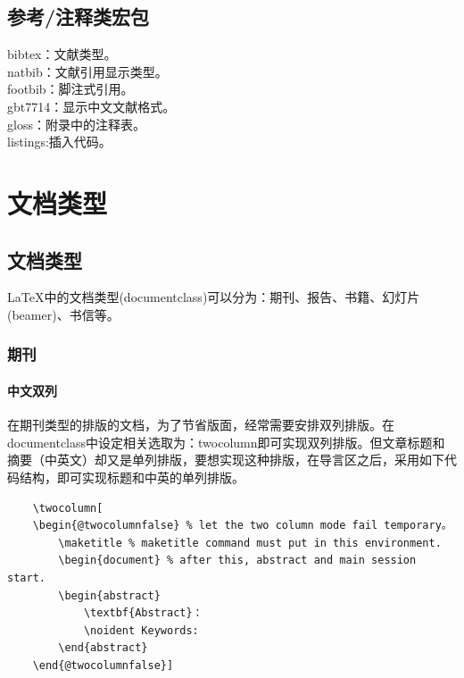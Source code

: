 \documentclass[12pt]{book}
\begin{document}
\section{参考/注释类宏包}

\noindent bibtex：文献类型。\\
natbib：文献引用显示类型。\\
footbib：脚注式引用。\\
gbt7714：显示中文文献格式。\\
gloss：附录中的注释表。\\
listings:插入代码。

\chapter{文档类型}

\section{文档类型}

\LaTeX{}中的文档类型(documentclass)可以分为：期刊、报告、书籍、幻灯片(beamer)、书信等。

\subsection{期刊}

\subsubsection{中文双列}
在期刊类型的排版的文档，为了节省版面，经常需要安排双列排版。在documentclass中设定相关选取为：twocolumn即可实现双列排版。但文章标题和摘要（中英文）却又是单列排版，要想实现这种排版，在导言区之后，采用如下代码结构，即可实现标题和中英的单列排版。

\begin{verbatim}
    \twocolumn[
    \begin{@twocolumnfalse} % let the two column mode fail temporary。
        \maketitle % maketitle command must put in this environment.
        \begin{document} % after this, abstract and main session start.
        \begin{abstract}
            \textbf{Abstract}：
            \noident Keywords:
        \end{abstract}
    \end{@twocolumnfalse}]     
\end{verbatim}
    
\end{document}
